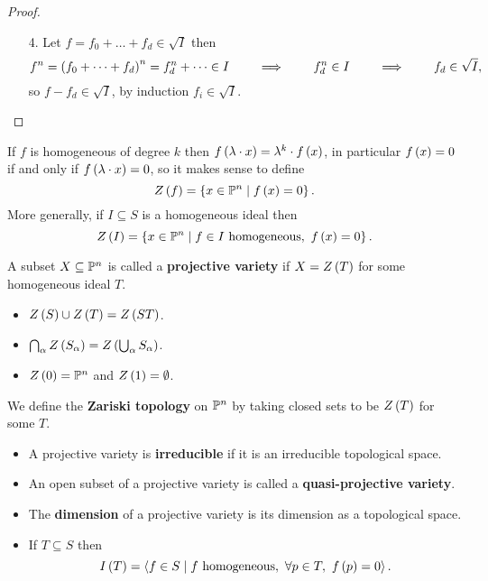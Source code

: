 \begin{proof}
\hfill
\begin{itemize}
\item[4.] Let $ f = f_0 + \dots + f_d \in \sqrt{I} $ then
$$ f^n = \rb{f_0 + \dots + f_d}^n = f_d^n + \dots \in I \qquad \implies \qquad f_d^n \in I \qquad \implies \qquad f_d \in \sqrt{I}, $$
so $ f - f_d \in \sqrt{I} $, by induction $ f_i \in \sqrt{I} $.
\end{itemize}
\end{proof}

\begin{definition}
If $ f $ is homogeneous of degree $ k $ then $ f\rb{\lambda \cdot x} = \lambda^k \cdot f\rb{x} $, in particular $ f\rb{x} = 0 $ if and only if $ f\rb{\lambda \cdot x} = 0 $, so it makes sense to define
$$ Z\rb{f} = \cb{x \in \P^n \mid f\rb{x} = 0}. $$
More generally, if $ I \subseteq S $ is a homogeneous ideal then
$$ Z\rb{I} = \cb{x \in \P^n \mid f \in I \ \text{homogeneous}, \ f\rb{x} = 0}. $$
\end{definition}

\begin{definition}
A subset $ X \subseteq \P^n $ is called a \textbf{projective variety} if $ X = Z\rb{T} $ for some homogeneous ideal $ T $.
\end{definition}

\begin{proposition}
\hfill
\begin{itemize}
\item $ Z\rb{S} \cup Z\rb{T} = Z\rb{ST} $.
\item $ \bigcap_\alpha Z\rb{S_\alpha} = Z\rb{\bigcup_\alpha S_\alpha} $.
\item $ Z\rb{0} = \P^n $ and $ Z\rb{1} = \emptyset $.
\end{itemize}
\end{proposition}

\begin{definition}
We define the \textbf{Zariski topology} on $ \P^n $ by taking closed sets to be $ Z\rb{T} $ for some $ T $.
\end{definition}

\begin{definition}
\hfill
\begin{itemize}
\item A projective variety is \textbf{irreducible} if it is an irreducible topological space.
\item An open subset of a projective variety is called a \textbf{quasi-projective variety}.
\item The \textbf{dimension} of a projective variety is its dimension as a topological space.
\item If $ T \subseteq S $ then
$$ I\rb{T} = \ab{f \in S \mid f \ \text{homogeneous}, \ \forall p \in T, \ f\rb{p} = 0}. $$
\end{itemize}
\end{definition}

